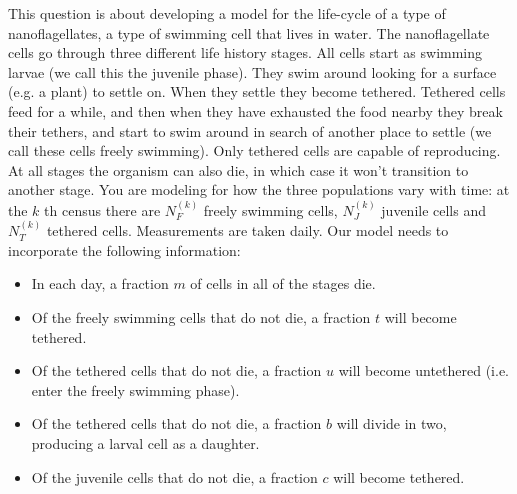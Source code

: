\documentclass[addpoints, 11pt]{exam}
\begin{document}
\begin{questions}
\question  This question is about developing a model for the life-cycle of a type of nanoflagellates, a type of swimming cell that lives in water. The nanoflagellate cells go through three different life history stages. All cells start as swimming larvae (we call this the juvenile phase). They swim around looking for a surface (e.g. a plant) to settle on. When they settle they become tethered. Tethered cells feed for a while, and then when they have exhausted the food nearby they break their tethers, and start to swim around in search of another place to settle (we call these cells freely swimming). Only tethered cells are capable of reproducing. At all stages the organism can also die, in which case it won't transition to another stage. You are modeling for how the three populations vary with time: at the $k$ th census there are $N_F^{(k)}$ freely swimming cells, $N_J^{(k)}$ juvenile cells and $N_T^{(k)}$ tethered cells. Measurements are taken daily. Our model needs to incorporate the following information:
\begin{itemize}
	\item In each day, a fraction $m$ of cells in all of the stages die.
	\item Of the freely swimming cells that do not die, a fraction $t$ will become tethered.
	\item Of the tethered cells that do not die, a fraction $u$ will become untethered (i.e. enter the freely swimming phase).
	\item Of the tethered cells that do not die, a fraction $b$ will divide in two, producing a larval cell as a daughter.
	\item Of the juvenile cells that do not die, a fraction $c$ will become tethered.
\end{itemize}
\begin{parts}

\end{parts}
\end{questions}
\end{document}

